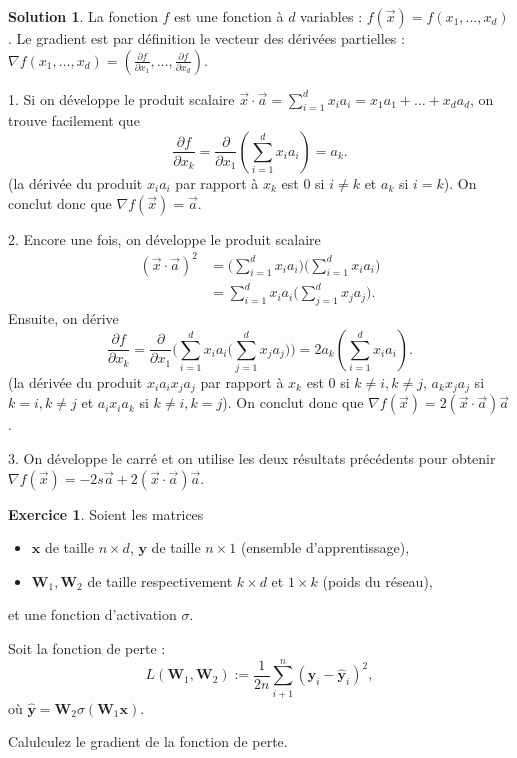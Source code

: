 \documentclass[a4paper,francais]{article}
\theoremstyle{definition}
\newtheorem{exercice}{Exercice}[section]
\newtheorem*{solution}{Solution}
\begin{document}
\begin{solution}
  La fonction $f$ est une fonction à $d$ variables : $f(\vec{x}) = f(x_1,\dots,x_d)$.
  Le gradient est par définition le vecteur des dérivées partielles :
  ${\nabla f}(x_1,\dots,x_d) = (\frac{\partial f}{\partial x_1}, \dots, \frac{\partial f}{\partial x_d})$.

  1. Si on développe le produit scalaire $\vec{x}\cdot\vec{a} = \sum_{i=1}^dx_i a_i = x_1a_1 + \dots + x_da_d$,
  on trouve facilement que
  \[ \frac{\partial f}{\partial x_k} = \frac{\partial}{\partial x_1}(\sum_{i=1}^dx_i a_i) = a_k.\]
  (la dérivée du produit $x_i a_i$ par rapport à $x_k$ est $0$ si $i\neq k$ et $a_k$ si $i=k$).
  On conclut donc que ${\nabla f}(\vec{x}) = \vec{a}$. 

  2. Encore une fois, on développe le produit scalaire
  \begin{align*}
    (\vec{x}\cdot\vec{a})^2 &= \big( \sum_{i=1}^d x_i a_i \big)\big( \sum_{i=1}^d x_i a_i \big) \\
    &= \sum_{i=1}^d x_i a_i \big( \sum_{j=1}^d x_j a_j \big).
  \end{align*}
  Ensuite, on dérive
  \[ \frac{\partial f}{\partial x_k} = \frac{\partial}{\partial x_1}\bigg( \sum_{i=1}^d x_i a_i \big( \sum_{j=1}^d x_j a_j \big) \bigg)
  = 2a_k (\sum_{i=1}^d x_i a_i).\]
  (la dérivée du produit $x_i a_i x_j a_j$ par rapport à $x_k$ est $0$ si $k\neq i, k\neq j$,
  $a_k x_j a_j$ si $k=i, k\neq j$ et $a_i x_i a_k$ si $k\neq i, k=j$).
  On conclut donc que ${\nabla f}(\vec{x}) = 2(\vec{x}\cdot\vec{a})\vec{a}$. 

  3. On développe le carré et on utilise les deux résultats précédents pour obtenir
  ${\nabla f}(\vec{x}) = -2s\vec{a} + 2(\vec{x}\cdot\vec{a})\vec{a}$. 
\end{solution}

\newcommand\mat[1]{\mathbf{#1}}

\begin{exercice}
  Soient les matrices
  \begin{itemize}
    \item $\mat{x}$ de taille $n \times d$, $\mat{y}$ de taille $n \times 1$ (ensemble d'apprentissage),
    \item $\mat{W}_1, \mat{W}_2$ de taille respectivement $k \times d$ et $1 \times k$ (poids du réseau),
  \end{itemize}
  et une fonction d'activation $\sigma$.
  
  Soit la fonction de perte :
  \[ L(\mat{W}_1, \mat{W}_2) := \frac{1}{2n} \sum_{i+1}^n (\mat{y}_i - \hat{\mat{y}}_i)^2, \]
  où $\hat{\mat{y}} = \mat{W}_2 \sigma ( \mat{W}_1 \mat{x} )$. 

  Calulculez le gradient de la fonction de perte. 
\end{exercice}
\end{document}
